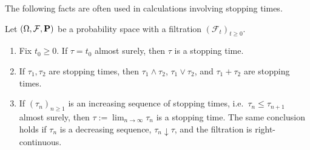 The following facts are often used in calculations involving stopping times.
\begin{proposition}
\label{prop:stop-facts}
Let $(\Omega,\mathcal{F},\mathbf{P})$ be a probability space with a filtration $(\mathcal{F}_t)_{t\ge 0}$.
\begin{enumerate}[\upshape (i)]
    \item Fix $t_0\ge 0$. If $\tau = t_0$ almost surely, then $\tau$ is a stopping time.
    
    \item If $\tau_1, \tau_2$ are stopping times, then $\tau_1 \wedge \tau_2$, $\tau_1 \vee \tau_2$, and $\tau_1+\tau_2$ are stopping times.
    
    \item If $(\tau_n)_{n \ge 1}$ is an increasing sequence of stopping times, i.e.\ $\tau_n \le \tau_{n+1}$ almost surely, then $\tau := \lim_{n \to \infty} \tau_n$ is a stopping time. The same conclusion holds if $\tau_n$ is a decreasing sequence, $\tau_n\downarrow\tau$, and the filtration is right-continuous.
\end{enumerate}
\end{proposition}

